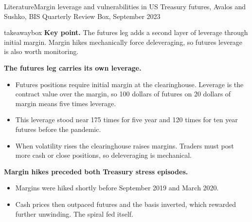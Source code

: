 \documentclass[aspectratio=169,11pt]{beamer}
\newcommand{\keypoint}[1]{%
  \begin{beamercolorbox}[sep=0.6em,wd=\textwidth]{takeawaybox}
    \textbf{Key point.} #1
  \end{beamercolorbox}}
\begin{document}
\begin{frame}{Literature}{Margin leverage and vulnerabilities in US Treasury futures, Avalos and Sushko, BIS Quarterly Review Box, September 2023}
  \footnotesize
  \keypoint{The futures leg adds a second layer of leverage through initial margin. Margin hikes mechanically force deleveraging, so futures leverage is also worth monitoring.}
  \medskip
  \textbf{The futures leg carries its own leverage.}
  \begin{itemize}
    \item Futures positions require initial margin at the clearinghouse. Leverage is the contract value over the margin, so 100 dollars of futures on 20 dollars of margin means five times leverage.
    \item This leverage stood near 175 times for five year and 120 times for ten year futures before the pandemic.
    \item When volatility rises the clearinghouse raises margins. Traders must post more cash or close positions, so deleveraging is mechanical.
  \end{itemize}
  \smallskip
  \textbf{Margin hikes preceded both Treasury stress episodes.}
  \begin{itemize}
    \item Margins were hiked shortly before September 2019 and March 2020. 
    \item Cash prices then outpaced futures and the basis inverted, which rewarded further unwinding. The spiral fed itself.
  \end{itemize}
\end{frame}
\end{document}
